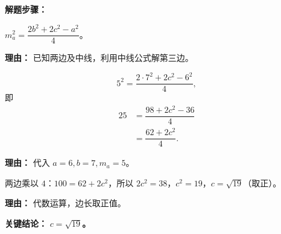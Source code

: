 \begin{examplebox}
	\textbf{\textcolor{CExample}{解题步骤：}}
	\begin{description}[style=nextline, leftmargin=2.8em, labelsep=0.5em, itemsep=0.45em]
		\item[\textbf{第一步（写出中线公式）：}] $m_a^2 = \dfrac{2b^2+2c^2-a^2}{4}$。
			\par\textbf{理由：} 已知两边及中线，利用中线公式解第三边。
		\item[\textbf{第二步（代入已知值）：}]
			\[
				5^2 = \dfrac{2\cdot7^2+2c^2-6^2}{4},
			\]
			即
			\[
				\begin{aligned}
					25 &= \dfrac{98+2c^2-36}{4} \\
					&= \dfrac{62+2c^2}{4}.
			\end{aligned}
			\]
			\par\textbf{理由：} 代入 $a=6,b=7,m_a=5$。
		\item[\textbf{第三步（解方程）：}] 两边乘以 $4$：$100 = 62+2c^2$，所以 $2c^2 = 38$，$c^2=19$，$c=\sqrt{19}$（取正）。
			\par\textbf{理由：} 代数运算，边长取正值。
	\end{description}

	\textbf{\textcolor{CExample}{关键结论：}}
	\textbf{$c = \sqrt{19}$。}
\end{examplebox}
